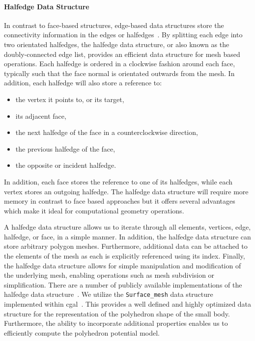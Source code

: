 \paragraph{Halfedge Data Structure}\label{sec:halfedge_data_structure}

In contrast to face-based structures, edge-based data structures store the connectivity information in the edges or halfedges~\cite{botsch2010,orourke1998,berg2008}.
By splitting each edge into two orientated halfedges, the halfedge data structure, or also known as the doubly-connected edge list, provides an efficient data structure for mesh based operations.
Each halfedge is ordered in a clockwise fashion around each face, typically such that the face normal is orientated outwards from the mesh.
In addition, each halfedge will also store a reference to:
\begin{itemize}
    \item the vertex it points to, or its target,
    \item its adjacent face,
    \item the next halfedge of the face in a counterclockwise direction,
    \item the previous halfedge of the face,
    \item the opposite or incident halfedge.
\end{itemize}
In addition, each face stores the reference to one of its halfedges, while each vertex stores an outgoing halfedge. 
The halfedge data structure will require more memory in contrast to face based approaches but it offers several advantages which make it ideal for computational geometry operations.

A halfedge data structure allows us to iterate through all elements, vertices, edge, halfedge, or face, in a simple manner.
In addition, the halfedge data structure can store arbitrary polygon meshes.
Furthermore, additional data can be attached to the elements of the mesh as each is explicitly referenced using its index.
Finally, the halfedge data structure allows for simple manipulation and modification of the underlying mesh, enabling operations such as mesh subdivision or simplification.
There are a number of publicly available implementations of the halfedge data structure~\cite{cgalproject2018,botsch2002}.
We utilize the \texttt{Surface\_mesh} data structure implemented within \gls{cgal}~\cite{sieger2011}.
This provides a well defined and highly optimized data structure for the representation of the polyhedron shape of the small body.
Furthermore, the ability to incorporate additional properties enables us to efficiently compute the polyhedron potential model.

